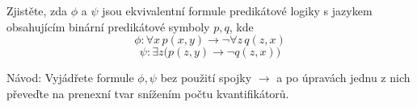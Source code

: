 \subsubsection{}
Zjistěte, zda $\phi$ a $\psi$ jsou ekvivalentní formule predikátové logiky s jazykem obsahujícím binární predikátové symboly $p,q$, kde
$$\phi : \forall x\, p(x,y) \rightarrow \neg\forall z\, q(z,x)$$
$$\psi : \exists z \bigl(p(z,y) \rightarrow \neg q(z,x)\bigr)$$

Návod:
Vyjádřete formule $\phi,\psi$ bez použití spojky $\rightarrow$ a po úpravách jednu z nich převeďte na prenexní tvar snížením počtu kvantifikátorů.


